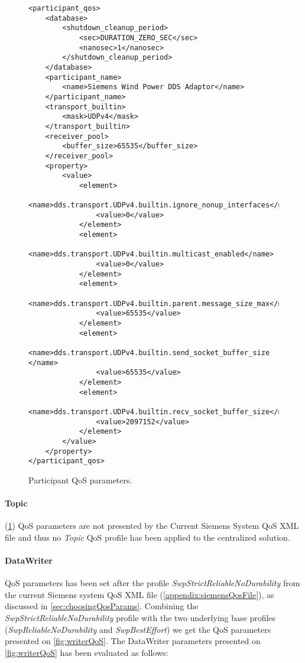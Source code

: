 \begin{figure}
\begin{lstlisting}
<participant_qos>
	<database>
		<shutdown_cleanup_period>
			<sec>DURATION_ZERO_SEC</sec>
			<nanosec>1</nanosec>
		</shutdown_cleanup_period>
	</database>
	<participant_name>
		<name>Siemens Wind Power DDS Adaptor</name>
	</participant_name>
	<transport_builtin>
		<mask>UDPv4</mask>
	</transport_builtin>
	<receiver_pool>
		<buffer_size>65535</buffer_size>
	</receiver_pool>
	<property>
		<value>
			<element>
				<name>dds.transport.UDPv4.builtin.ignore_nonup_interfaces</name>
				<value>0</value>
			</element>
			<element>
				<name>dds.transport.UDPv4.builtin.multicast_enabled</name>
				<value>0</value>
			</element>
			<element>
				<name>dds.transport.UDPv4.builtin.parent.message_size_max</name>
				<value>65535</value>
			</element>
			<element>
				<name>dds.transport.UDPv4.builtin.send_socket_buffer_size </name>
				<value>65535</value>
			</element>
			<element>
				<name>dds.transport.UDPv4.builtin.recv_socket_buffer_size</name>
				<value>2097152</value>
			</element>
		</value>
	</property>
</participant_qos>
\end{lstlisting}
\caption[Participant QoS parameters]{
		\label{fig:parQos} 
		\footnotesize{Participant QoS parameters.}
	}
\end{figure}

\paragraph{Topic} (\cref{fig:parQos}) QoS parameters are not presented by the Current Siemens System QoS XML file and thus no \textit{Topic} QoS profile has been applied to the centralized solution. 

\paragraph{DataWriter} QoS parameters has been set after the profile \textit{SwpStrictReliableNoDurability} from the current Siemens system QoS XML file (\cref{appendix:siemensQosFile}), as discussed in \cref{sec:choosingQosParams}. Combining the \textit{SwpStrictReliableNoDurability} profile with the two underlying base profiles (\textit{SwpReliableNoDurability} and \textit{SwpBestEffort}) we get the QoS parameters presented on \cref{fig:writerQoS}. The DataWriter parameters presented on \cref{fig:writerQoS} has been evaluated as follows:

